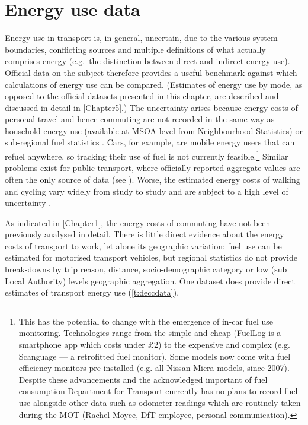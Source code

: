 \section{Energy use data} \label{senergyusedata}
Energy use in transport is, in
general, uncertain, due to the various system boundaries, conflicting sources
and multiple definitions of what actually comprises energy (e.g.~the distinction
between direct and indirect energy use). Official data on the subject therefore
provides a useful benchmark against which calculations of energy use can be
compared.
(Estimates of energy use by mode, as opposed to
the official datasets presented in this chapter, are described and discussed in
detail in \cref{Chapter5}.) %
The uncertainty arises because
energy costs of personal travel and hence commuting are not recorded in
the same way as
household energy use (available at MSOA level from Neighbourhood Statistics) or
sub-regional fuel statistics \citep{Decc2008}. Cars, for example,
are mobile energy users that
can refuel anywhere, so tracking their use of fuel is not currently
feasible.\footnote{This
has the potential to change with the emergence of
in-car fuel use monitoring. Technologies range from the simple and cheap
(FuelLog is a smartphone app which costs under $\pounds2$) to the expensive
and complex (e.g. Scanguage --- a retrofitted fuel monitor).
Some models now come with fuel efficiency monitors pre-installed
(e.g. all Nissan Micra models, since 2007). Despite these advancements
and the acknowledged important of fuel consumption Department for Transport
currently has no plans to record fuel use alongside other data such as
odometer readings which are routinely taken during the MOT (Rachel Moyce,
DfT employee, personal communication).
}
Similar
problems exist for public transport, where officially reported aggregate values
are often the only source of data (see \citealp{LondonUnderground2007}).
Worse, the estimated energy costs of walking and cycling  vary widely from study
to study and are subject to a high level of uncertainty
\citep{Coley2002, Brand2006, Lovelace2011-assessing}.

As indicated in \cref{Chapter1}, %
the energy costs of commuting have not been previously analysed in detail.
There is little direct evidence about the energy costs of transport to
work, let alone its geographic variation: fuel use can be estimated for
motorised transport vehicles, but regional statistics do not provide break-downs
by trip reason, distance, socio-demographic category or low (sub Local
Authority) levels geographic aggregation. One dataset \citep{Decc2008-tcons,
Decc2013-regcons} does
provide direct estimates of transport energy use (\cref{t:deccdata}).

